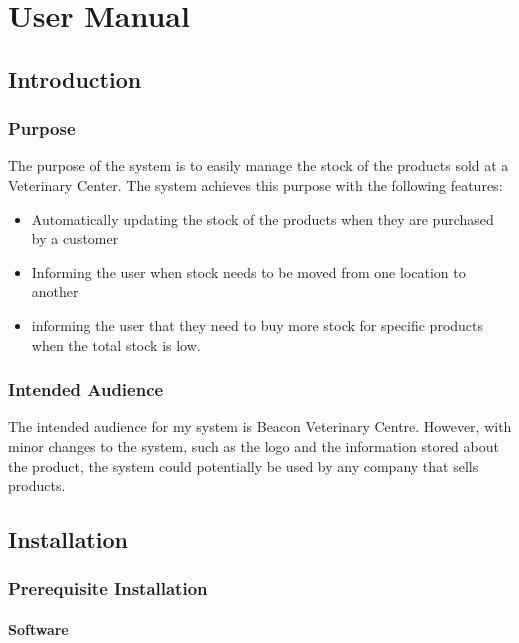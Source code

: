 \chapter{User Manual}

\section{Introduction}

\subsection{Purpose}

The purpose of the system is to easily manage the stock of the products sold at a Veterinary Center. The system achieves this purpose with the following features:

\begin{itemize}
\item{Automatically updating the stock of the products when they are purchased by a customer}
\item{Informing the user when stock needs to be moved from one location to another}
\item{informing the user that they need to buy more stock for specific products when the total stock is low.}
\end{itemize}

\subsection{Intended Audience}

The intended audience for my system is Beacon Veterinary Centre. However, with minor changes to the system, such as the logo and the information stored about the product, the system could potentially be used by any company that sells products. 

\section{Installation}

\subsection{Prerequisite Installation}

\subsubsection{Software}

